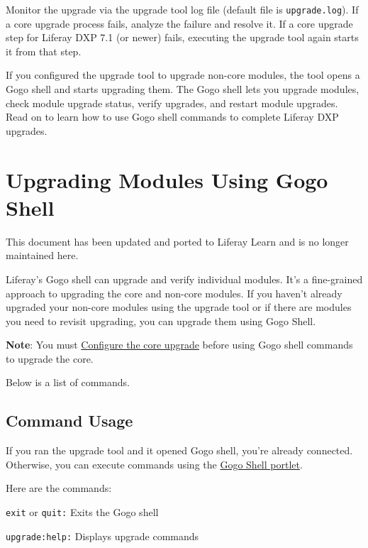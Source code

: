 Monitor the upgrade via the upgrade tool log file (default file is
\texttt{upgrade.log}). If a core upgrade process fails, analyze the
failure and resolve it. If a core upgrade step for Liferay DXP 7.1 (or
newer) fails, executing the upgrade tool again starts it from that step.

If you configured the upgrade tool to upgrade non-core modules, the tool
opens a Gogo shell and starts upgrading them. The Gogo shell lets you
upgrade modules, check module upgrade status, verify upgrades, and
restart module upgrades. Read on to learn how to use Gogo shell commands
to complete Liferay DXP upgrades.

\chapter{Upgrading Modules Using Gogo
Shell}\label{upgrading-modules-using-gogo-shell}

{This document has been updated and ported to Liferay Learn and is no
longer maintained here.}

Liferay's Gogo shell can upgrade and verify individual modules. It's a
fine-grained approach to upgrading the core and non-core modules. If you
haven't already upgraded your non-core modules using the upgrade tool or
if there are modules you need to revisit upgrading, you can upgrade them
using Gogo Shell.

\noindent\hrulefill

\textbf{Note}: You must
\href{/docs/7-2/deploy/-/knowledge_base/d/configuring-the-data-upgrade}{Configure
the core upgrade} before using Gogo shell commands to upgrade the core.

\noindent\hrulefill

Below is a list of commands.

\section{Command Usage}\label{command-usage}

If you ran the upgrade tool and it opened Gogo shell, you're already
connected. Otherwise, you can execute commands using the
\href{/docs/7-2/customization/-/knowledge_base/c/using-the-felix-gogo-shell}{Gogo
Shell portlet}.

Here are the commands:

\texttt{exit} or \texttt{quit:} Exits the Gogo shell

\texttt{upgrade:help:} Displays upgrade commands

